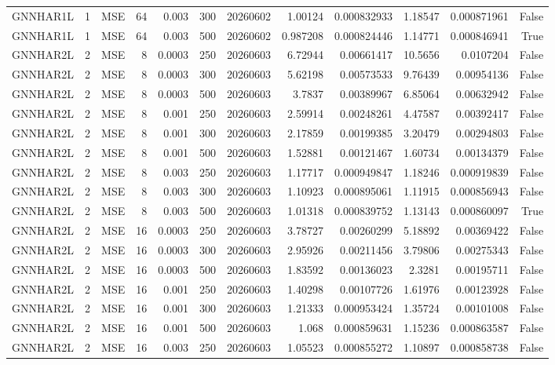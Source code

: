 \begin{tabular}{lrlrrrrrrrrr}
GNNHAR1L & 1 & MSE & 64 & 0.003 & 300 & 20260602 & 1.00124 & 0.000832933 & 1.18547 & 0.000871961 & False \\
GNNHAR1L & 1 & MSE & 64 & 0.003 & 500 & 20260602 & 0.987208 & 0.000824446 & 1.14771 & 0.000846941 & True \\
GNNHAR2L & 2 & MSE & 8 & 0.0003 & 250 & 20260603 & 6.72944 & 0.00661417 & 10.5656 & 0.0107204 & False \\
GNNHAR2L & 2 & MSE & 8 & 0.0003 & 300 & 20260603 & 5.62198 & 0.00573533 & 9.76439 & 0.00954136 & False \\
GNNHAR2L & 2 & MSE & 8 & 0.0003 & 500 & 20260603 & 3.7837 & 0.00389967 & 6.85064 & 0.00632942 & False \\
GNNHAR2L & 2 & MSE & 8 & 0.001 & 250 & 20260603 & 2.59914 & 0.00248261 & 4.47587 & 0.00392417 & False \\
GNNHAR2L & 2 & MSE & 8 & 0.001 & 300 & 20260603 & 2.17859 & 0.00199385 & 3.20479 & 0.00294803 & False \\
GNNHAR2L & 2 & MSE & 8 & 0.001 & 500 & 20260603 & 1.52881 & 0.00121467 & 1.60734 & 0.00134379 & False \\
GNNHAR2L & 2 & MSE & 8 & 0.003 & 250 & 20260603 & 1.17717 & 0.000949847 & 1.18246 & 0.000919839 & False \\
GNNHAR2L & 2 & MSE & 8 & 0.003 & 300 & 20260603 & 1.10923 & 0.000895061 & 1.11915 & 0.000856943 & False \\
GNNHAR2L & 2 & MSE & 8 & 0.003 & 500 & 20260603 & 1.01318 & 0.000839752 & 1.13143 & 0.000860097 & True \\
GNNHAR2L & 2 & MSE & 16 & 0.0003 & 250 & 20260603 & 3.78727 & 0.00260299 & 5.18892 & 0.00369422 & False \\
GNNHAR2L & 2 & MSE & 16 & 0.0003 & 300 & 20260603 & 2.95926 & 0.00211456 & 3.79806 & 0.00275343 & False \\
GNNHAR2L & 2 & MSE & 16 & 0.0003 & 500 & 20260603 & 1.83592 & 0.00136023 & 2.3281 & 0.00195711 & False \\
GNNHAR2L & 2 & MSE & 16 & 0.001 & 250 & 20260603 & 1.40298 & 0.00107726 & 1.61976 & 0.00123928 & False \\
GNNHAR2L & 2 & MSE & 16 & 0.001 & 300 & 20260603 & 1.21333 & 0.000953424 & 1.35724 & 0.00101008 & False \\
GNNHAR2L & 2 & MSE & 16 & 0.001 & 500 & 20260603 & 1.068 & 0.000859631 & 1.15236 & 0.000863587 & False \\
GNNHAR2L & 2 & MSE & 16 & 0.003 & 250 & 20260603 & 1.05523 & 0.000855272 & 1.10897 & 0.000858738 & False \\

\end{tabular}
